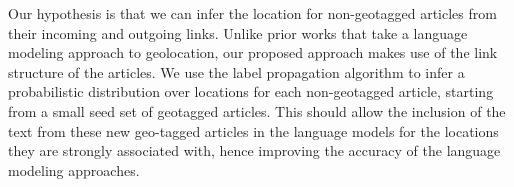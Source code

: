 \par Our hypothesis is that we can infer the location for non-geotagged
articles from their incoming and outgoing links. Unlike prior works that take
a language modeling approach to geolocation, our proposed approach makes use
of the link structure of the articles. We use the label propagation algorithm
to infer a probabilistic distribution over locations for each non-geotagged
article, starting from a small seed set of geotagged articles. This should
allow the inclusion of the text from these new geo-tagged articles in the
language models for the locations they are strongly associated with, hence
improving the accuracy of the language modeling approaches.


